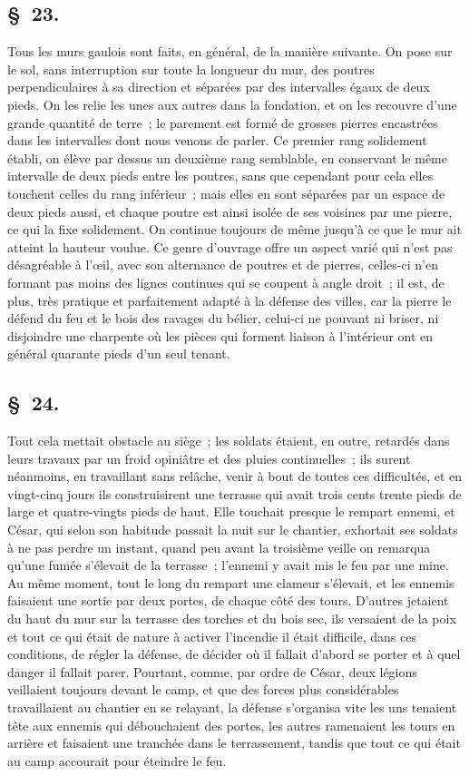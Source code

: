 \documentclass[french,twoside]{book} %
\begin{document}
\subsection[{§ 23.}]{ \textsc{§ 23.} }
\noindent Tous les murs gaulois sont faits, en général, de la manière suivante. On pose sur le sol, sans interruption sur toute la longueur du mur, des poutres perpendiculaires à sa direction et séparées par des intervalles égaux de deux pieds. On les relie les unes aux autres dans la fondation, et on les recouvre d’une grande quantité de terre ; le parement est formé de grosses pierres encastrées dans les intervalles dont nous venons de parler. Ce premier rang solidement établi, on élève par dessus un deuxième rang semblable, en conservant le même intervalle de deux pieds entre les poutres, sans que cependant pour cela elles touchent celles du rang inférieur ; mais elles en sont séparées par un espace de deux pieds aussi, et chaque poutre est ainsi isolée de ses voisines par une pierre, ce qui la fixe solidement. On continue toujours de même jusqu’à ce que le mur ait atteint la hauteur voulue. Ce genre d’ouvrage offre un aspect varié qui n’est pas désagréable à l’œil, avec son alternance de poutres et de pierres, celles-ci n’en formant pas moins des lignes continues qui se coupent à angle droit ; il est, de plus, très pratique et parfaitement adapté à la défense des villes, car la pierre le défend du feu et le bois des ravages du bélier, celui-ci ne pouvant ni briser, ni disjoindre une charpente où les pièces qui forment liaison à l’intérieur ont en général quarante pieds d’un seul tenant.
\subsection[{§ 24.}]{ \textsc{§ 24.} }
\noindent Tout cela mettait obstacle au siège ; les soldats étaient, en outre, retardés dans leurs travaux par un froid opiniâtre et des pluies continuelles ; ils surent néanmoins, en travaillant sans relâche, venir à bout de toutes ces difficultés, et en vingt-cinq jours ils construisirent une terrasse qui avait trois cents trente pieds de large et quatre-vingts pieds de haut. Elle touchait presque le rempart ennemi, et César, qui selon son habitude passait la nuit sur le chantier, exhortait ses soldats à ne pas perdre un instant, quand peu avant la troisième veille on remarqua qu’une fumée s’élevait de la terrasse ; l’ennemi y avait mis le feu par une mine. Au même moment, tout le long du rempart une clameur s’élevait, et les ennemis faisaient une sortie par deux portes, de chaque côté des tours. D'autres jetaient du haut du mur sur la terrasse des torches et du bois sec, ils versaient de la poix et tout ce qui était de nature à activer l’incendie il était difficile, dans ces conditions, de régler la défense, de décider où il fallait d’abord se porter et à quel danger il fallait parer. Pourtant, comme, par ordre de César, deux légions veillaient toujours devant le camp, et que des forces plus considérables travaillaient au chantier en se relayant, la défense s’organisa vite les uns tenaient tête aux ennemis qui débouchaient des portes, les autres ramenaient les tours en arrière et faisaient une tranchée dans le terrassement, tandis que tout ce qui était au camp accourait pour éteindre le feu.
\end{document}
